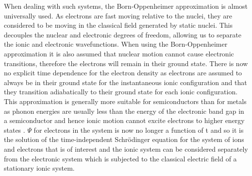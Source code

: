 \documentclass[11pt, twoside]{report}
\begin{document}
When dealing with such systems, the Born-Oppenheimer approximation is almost universally used. As electrons are fast moving relative to the nuclei, they are considered to be moving in the classical field generated by static nuclei. This decouples the nuclear and electronic degrees of freedom, allowing us to separate the ionic and electronic wavefunctions. 
When using the Born-Oppenheimer approximation it is also assumed that nuclear motion cannot cause electronic transitions, therefore the electrons will remain in their ground state. There is now no explicit time dependence for the electron density as electrons are assumed to always be in their ground state for the instantaneous ionic configuration and that they transition adiabatically to their ground state for each ionic configuration. This approximation is generally more suitable for semiconductors than for metals as phonon energies are usually less than the energy of the electronic band gap in a semiconductor and hence ionic motion cannot excite electrons to higher energy states \cite{Prasad_ch2}. $\Psi$ for electrons in the system is now no longer a function of t and so it is the solution of the time-independent Schr{\"o}dinger equation for the system of ions and electrons that is of interest and the ionic system can be considered separately from the electronic system which is subjected to the classical electric field of a stationary ionic system.
\end{document}
